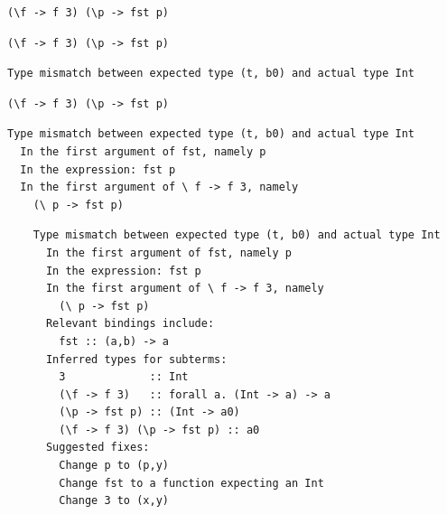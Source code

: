 \documentclass[xcolor=svgnames,12pt,aspectratio=169]{beamer}
\newenvironment{xframe}[1][]
  {\begin{frame}[fragile,environment=xframe,#1]}
  {\end{frame}}
\begin{document}
\begin{xframe}{}
  \begin{center}
\begin{BVerbatim}
(\f -> f 3) (\p -> fst p)
\end{BVerbatim}
  \end{center}
\end{xframe}

\begin{xframe}{}

  \begin{center}
    \begin{BVerbatim}
(\f -> f 3) (\p -> fst p)
    \end{BVerbatim}

    \begin{verbatim}
Type mismatch between expected type (t, b0) and actual type Int
    \end{verbatim}
  \end{center}
\end{xframe}

\begin{xframe}

  \begin{center}
    \begin{BVerbatim}
(\f -> f 3) (\p -> fst p)
    \end{BVerbatim}

\begin{verbatim}
Type mismatch between expected type (t, b0) and actual type Int
  In the first argument of fst, namely p
  In the expression: fst p
  In the first argument of \ f -> f 3, namely
    (\ p -> fst p)
\end{verbatim}
  \end{center}
\end{xframe}

\begin{xframe}
  \footnotesize
  \begin{verbatim}
    Type mismatch between expected type (t, b0) and actual type Int
      In the first argument of fst, namely p
      In the expression: fst p
      In the first argument of \ f -> f 3, namely
        (\ p -> fst p)
      Relevant bindings include:
        fst :: (a,b) -> a
      Inferred types for subterms:
        3             :: Int
        (\f -> f 3)   :: forall a. (Int -> a) -> a
        (\p -> fst p) :: (Int -> a0)
        (\f -> f 3) (\p -> fst p) :: a0
      Suggested fixes:
        Change p to (p,y)
        Change fst to a function expecting an Int
        Change 3 to (x,y)
  \end{verbatim}
\end{xframe}
\end{document}
